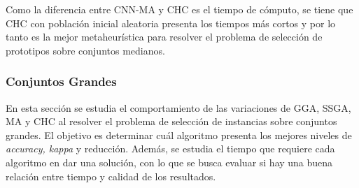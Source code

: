 Como la diferencia entre CNN-MA y CHC es el tiempo de cómputo, se tiene que CHC con población inicial aleatoria presenta los tiempos más cortos y por lo tanto es la mejor metaheurística para resolver el problema de selección de prototipos sobre conjuntos medianos.


\subsubsection{Conjuntos Grandes}

En esta sección se estudia el comportamiento de las variaciones de GGA, SSGA, MA y CHC al resolver el problema de selección de instancias sobre conjuntos grandes. El objetivo es determinar cuál algoritmo presenta los mejores niveles de \emph{accuracy, kappa} y reducción. Además, se estudia el tiempo que requiere cada algoritmo en dar una solución, con lo que se busca evaluar si hay una buena relación entre tiempo y calidad de los resultados.

